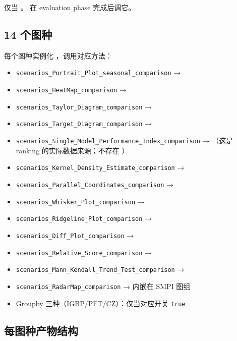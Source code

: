 仅当 。 在 evaluation phase 完成后调它。

\subsection{14 个图种}

每个图种实例化 ，调用对应方法：

\begin{itemize}
  \item \texttt{scenarios\_Portrait\_Plot\_seasonal\_comparison} → 
  \item \texttt{scenarios\_HeatMap\_comparison} → 
  \item \texttt{scenarios\_Taylor\_Diagram\_comparison} → 
  \item \texttt{scenarios\_Target\_Diagram\_comparison} → 
  \item \texttt{scenarios\_Single\_Model\_Performance\_Index\_comparison} → （这是 ranking 的实际数据来源；不存在 ）
  \item \texttt{scenarios\_Kernel\_Density\_Estimate\_comparison} → 
  \item \texttt{scenarios\_Parallel\_Coordinates\_comparison} → 
  \item \texttt{scenarios\_Whisker\_Plot\_comparison} → 
  \item \texttt{scenarios\_Ridgeline\_Plot\_comparison} → 
  \item \texttt{scenarios\_Diff\_Plot\_comparison} → 
  \item \texttt{scenarios\_Relative\_Score\_comparison} → 
  \item \texttt{scenarios\_Mann\_Kendall\_Trend\_Test\_comparison} → 
  \item \texttt{scenarios\_RadarMap\_comparison} → 内嵌在 SMPI 图组
  \item Groupby 三种（IGBP/PFT/CZ）：仅当对应开关 \texttt{true}
\end{itemize}

\subsection{每图种产物结构}

